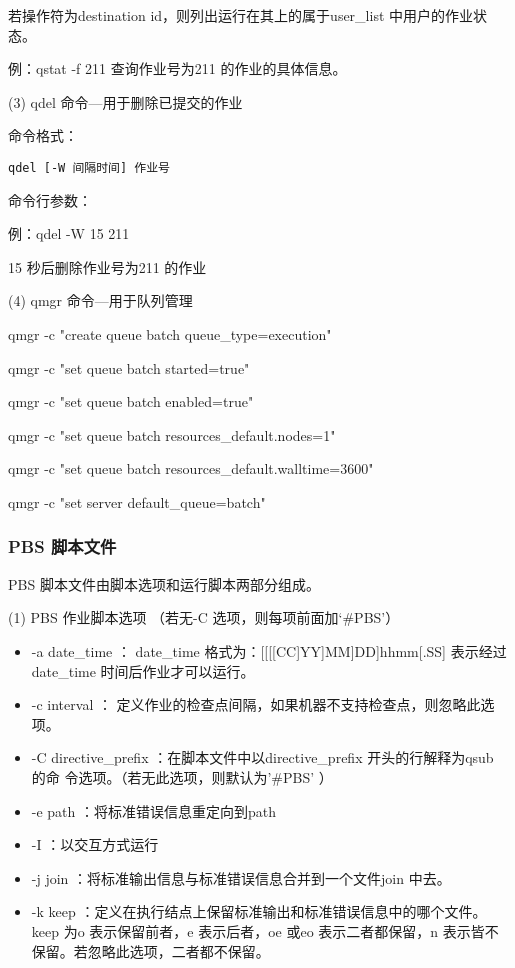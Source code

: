 {若操作符为destination id，则列出运行在其上的属于user\_list 中用户的作业状态。

例：qstat -f 211 查询作业号为211 的作业的具体信息。


(3) qdel 命令—用于删除已提交的作业

命令格式：

\verb*|qdel [-W 间隔时间] 作业号|

命令行参数：

例：qdel -W 15 211 

15 秒后删除作业号为211 的作业


(4) qmgr 命令—用于队列管理


qmgr -c "create queue batch queue\_type=execution"

qmgr -c "set queue batch started=true"

qmgr -c "set queue batch enabled=true"

qmgr -c "set queue batch resources\_default.nodes=1"

qmgr -c "set queue batch resources\_default.walltime=3600"

qmgr -c "set server default\_queue=batch"



\subsubsection{PBS 脚本文件}
PBS 脚本文件由脚本选项和运行脚本两部分组成。

(1) PBS 作业脚本选项 （若无-C 选项，则每项前面加‘\#PBS’）
\begin{itemize}
\item -a date\_time ： date\_time 格式为：[[[[CC]YY]MM]DD]hhmm[.SS]
表示经过date\_time 时间后作业才可以运行。

\item -c interval ： 定义作业的检查点间隔，如果机器不支持检查点，则忽略此选项。

\item -C directive\_prefix ：在脚本文件中以directive\_prefix 开头的行解释为qsub 的命
令选项。（若无此选项，则默认为’\#PBS’ ）

\item -e path ：将标准错误信息重定向到path

\item -I ：以交互方式运行

\item -j join ：将标准输出信息与标准错误信息合并到一个文件join 中去。

\item  -k keep ：定义在执行结点上保留标准输出和标准错误信息中的哪个文件。
keep 为o 表示保留前者，e 表示后者，oe 或eo 表示二者都保留，n 表示皆不保留。若忽略此选项，二者都不保留。


\end{itemize}}
